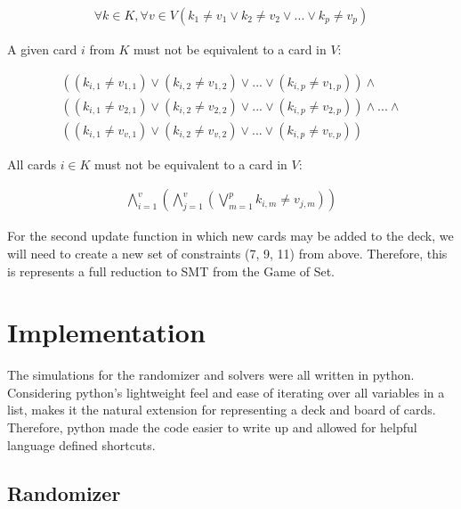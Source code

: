 \documentclass[pageno]{jpaper}
\begin{document}
\begin{align}
	\forall k \in K, \forall v \in V \left (k_1 \neq v_1 \vee k_2 \neq v_2 \vee ... \vee k_p \neq v_p \right)
\end{align}

A given card $i$ from $K$ must not be equivalent to a card in $V$:

\begin{multline}
	((k_{i,1} \neq v_{1,1}) \vee (k_{i,2} \neq v_{1,2}) \vee ... \vee (k_{i,p} \neq v_{1,p})) \wedge \\
	 ((k_{i,1} \neq v_{2,1}) \vee (k_{i,2} \neq v_{2,2}) \vee ... \vee (k_{i,p} \neq v_{2,p}))  \wedge ... \wedge \\ ((k_{i,1} \neq v_{v,1}) \vee (k_{i,2} \neq v_{v,2}) \vee ... \vee (k_{i,p} \neq v_{v,p})) 
\end{multline}

All cards $i \in K$ must not be equivalent to a card in $V$:

\begin{align}
	\bigwedge \limits_{i=1}^{v}   \left( \bigwedge \limits_{j=1}^{v}  \left( \bigvee \limits_{m = 1}^{p} k_{i,m} \neq v_{j,m} \right)   \right)
\end{align}




For the second update function in which new cards may be added to the deck, we will need to create a new set of constraints (7, 9, 11) from above. Therefore, this is represents a full reduction to SMT from the Game of Set. 


\section{Implementation}

The simulations for the randomizer and solvers were all written in python. Considering python's lightweight feel and ease of iterating over all variables in a list, makes it the natural extension for representing a deck and board of cards. Therefore, python made the code easier to write up and allowed for helpful language defined shortcuts. 


\subsection{Randomizer}
\end{document}
